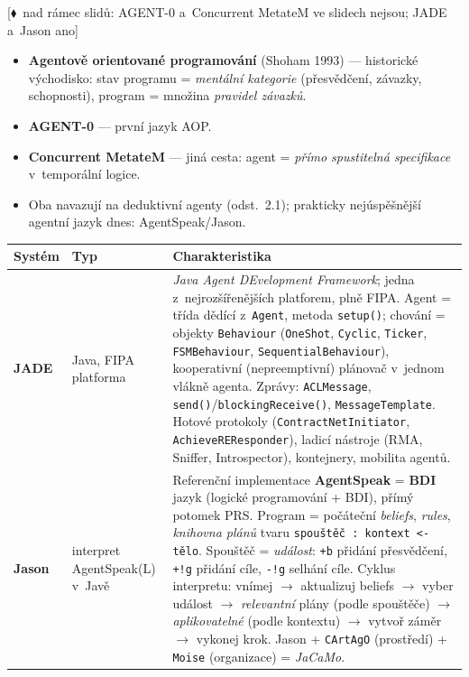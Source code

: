 \documentclass[11pt,a4paper]{article}
\theoremstyle{definition}
\newcommand{\mimoq}[1]{\textcolor{markcol}{\textsf{\footnotesize[$\blacklozenge$~nad rámec slidů: #1]}}}
\begin{document}
\noindent\mimoq{AGENT-0 a~Concurrent MetateM ve slidech nejsou; JADE a~Jason ano}
\begin{itemize}
\item \textbf{Agentově orientované programování} (Shoham 1993) --- historické východisko:
  stav programu = \emph{mentální kategorie} (přesvědčení, závazky, schopnosti), program =
  množina \emph{pravidel závazků}.
\item \textbf{AGENT-0} --- první jazyk AOP.
\item \textbf{Concurrent MetateM} --- jiná cesta: agent = \emph{přímo spustitelná
  specifikace} v~temporální logice.
\item Oba navazují na deduktivní agenty (odst.\ 2.1); prakticky nejúspěšnější agentní jazyk
  dnes: AgentSpeak/Jason.
\end{itemize}
\begin{center}\small
\begin{tabular}{p{} p{} p{}}
\toprule
\textbf{Systém} & \textbf{Typ} & \textbf{Charakteristika} \\
\midrule
\textbf{JADE}
  & Java, FIPA platforma
  & \emph{Java Agent DEvelopment Framework}; jedna z~nejrozšířenějších platforem, plně
    FIPA. Agent = třída dědící z~\texttt{Agent}, metoda \texttt{setup()};
    chování = objekty \texttt{Behaviour} (\texttt{OneShot}, \texttt{Cyclic},
    \texttt{Ticker}, \texttt{FSMBehaviour}, \texttt{SequentialBehaviour}), kooperativní
    (nepreemptivní) plánovač v~jednom vlákně agenta. Zprávy: \texttt{ACLMessage},
    \texttt{send()}/\texttt{blockingReceive()}, \texttt{MessageTemplate}. Hotové protokoly
    (\texttt{ContractNetInitiator}, \texttt{AchieveREResponder}), ladicí nástroje (RMA,
    Sniffer, Introspector), kontejnery, mobilita agentů. \\
\textbf{Jason}
  & interpret AgentSpeak(L) v~Javě
  & Referenční implementace \textbf{AgentSpeak} = \textbf{BDI} jazyk (logické programování
    + BDI), přímý potomek PRS. Program = počáteční \emph{beliefs}, \emph{rules},
    \emph{knihovna plánů} tvaru \texttt{spouštěč : kontext <- tělo}. Spouštěč =
    \emph{událost}: \texttt{+b} přidání přesvědčení, \texttt{+!g} přidání cíle, \texttt{-!g}
    selhání cíle. Cyklus interpretu: vnímej $\to$ aktualizuj beliefs $\to$ vyber událost
    $\to$ \emph{relevantní} plány (podle spouštěče) $\to$ \emph{aplikovatelné} (podle
    kontextu) $\to$ vytvoř záměr $\to$ vykonej krok. Jason + \texttt{CArtAgO} (prostředí)
    + \texttt{Moise} (organizace) = \emph{JaCaMo}. \\

\end{tabular}
\end{center}
\end{document}
